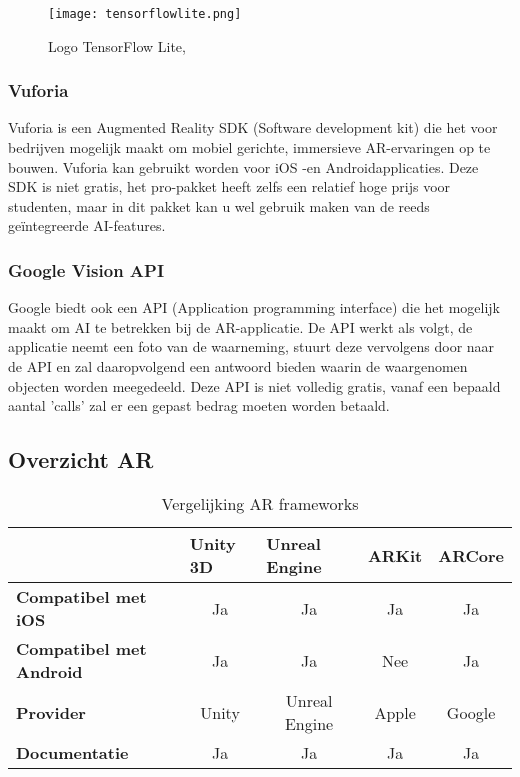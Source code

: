 \begin{figure}[H]
	\centering
	\texttt{[image: tensorflowlite.png]}
	\caption{Logo TensorFlow Lite, \autocite{TensorFlowLite2020}}
\end{figure}

\subsubsection{Vuforia}
Vuforia is een Augmented Reality SDK (Software development kit) die het voor bedrijven mogelijk maakt om mobiel gerichte, immersieve AR-ervaringen op te bouwen. Vuforia kan gebruikt worden voor iOS -en Androidapplicaties. Deze SDK is niet gratis, het pro-pakket heeft zelfs een relatief hoge prijs voor studenten, maar in dit pakket kan u wel gebruik maken van de reeds geïntegreerde AI-features. \autocite{Girish2020}

\subsubsection{Google Vision API}
Google biedt ook een API (Application programming interface) die het mogelijk maakt om AI te betrekken bij de AR-applicatie. De API werkt als volgt, de applicatie neemt een foto van de waarneming, stuurt deze vervolgens door naar de API en zal daaropvolgend een antwoord bieden waarin de waargenomen objecten worden meegedeeld. Deze API is niet volledig gratis, vanaf een bepaald aantal 'calls' zal er een gepast bedrag moeten worden betaald.

\subsection{Overzicht AR}
\begin{table}[H]
	\centering
	\begin{tabular}{|l|c|c|c|c|}
		\hline
		& \multicolumn{1}{l|}{Unity 3D} & \multicolumn{1}{l|}{Unreal Engine} & \multicolumn{1}{l|}{ARKit} & \multicolumn{1}{l|}{ARCore} \\ \hline
		\textbf{Compatibel met iOS}     & Ja                            & Ja                                 & Ja                         & Ja                          \\ \hline
		\textbf{Compatibel met Android} & Ja                            & Ja                                 & Nee                        & Ja                          \\ \hline
		\textbf{Provider}               & Unity                         & Unreal Engine                      & Apple                      & Google                      \\ \hline
		\textbf{Documentatie}           & Ja                            & Ja                                 & Ja                         & Ja                          \\ \hline
	\end{tabular}
	\caption{Vergelijking AR frameworks}
\end{table}
\pagebreak
